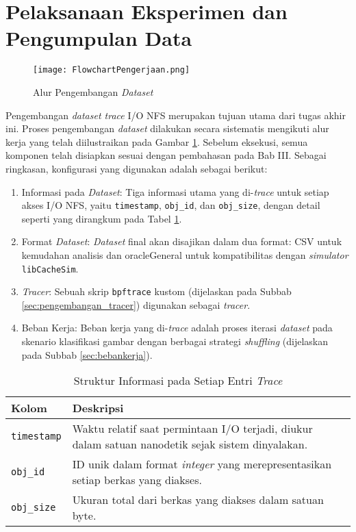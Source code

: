 \section{Pelaksanaan Eksperimen dan Pengumpulan Data}

\begin{figure}[t]
    \centering
    \texttt{[image: FlowchartPengerjaan.png]}
    \caption{Alur Pengembangan \textit{Dataset}}
    \label{fig:FlowchartPengerjaan}
\end{figure}

Pengembangan \textit{dataset trace} I/O NFS merupakan tujuan utama dari tugas akhir ini. Proses pengembangan \textit{dataset} dilakukan secara sistematis mengikuti alur kerja yang telah diilustraikan pada Gambar \ref{fig:FlowchartPengerjaan}. Sebelum eksekusi, semua komponen telah disiapkan sesuai dengan pembahasan pada Bab III. Sebagai ringkasan, konfigurasi yang digunakan adalah sebagai berikut:
\begin{enumerate}[itemsep=0pt, parsep=0pt]
    \item Informasi pada \textit{Dataset}: Tiga informasi utama yang di-\textit{trace} untuk setiap akses I/O NFS, yaitu \texttt{timestamp}, \texttt{obj\_id}, dan \texttt{obj\_size}, dengan detail seperti yang dirangkum pada Tabel \ref{tab:trace_format}.
    \item Format \textit{Dataset}: \textit{Dataset} final akan disajikan dalam dua format: CSV untuk kemudahan analisis dan oracleGeneral untuk kompatibilitas dengan \textit{simulator} \texttt{libCacheSim}.
    \item \textit{Tracer}: Sebuah skrip \texttt{bpftrace} kustom (dijelaskan pada Subbab \ref{sec:pengembangan_tracer}) digunakan sebagai \textit{tracer}.
    \item Beban Kerja: Beban kerja yang di-\textit{trace} adalah proses iterasi \textit{dataset} pada skenario klasifikasi gambar dengan berbagai strategi \textit{shuffling} (dijelaskan pada Subbab \ref{sec:bebankerja}).
\end{enumerate}

\begin{table}[t]
    \centering
    \caption{Struktur Informasi pada Setiap Entri \textit{Trace}}
    \label{tab:trace_format}
    \begin{tabular}{|l|p{}|}
        \hline
        \textbf{Kolom} & \textbf{Deskripsi} \\
        \hline
        \texttt{timestamp} & Waktu relatif saat permintaan I/O terjadi, diukur dalam satuan nanodetik sejak sistem dinyalakan. \\
        \hline
        \texttt{obj\_id}    & ID unik dalam format \textit{integer} yang merepresentasikan setiap berkas yang diakses. \\
        \hline
        \texttt{obj\_size}  & Ukuran total dari berkas yang diakses dalam satuan byte. \\
        \hline
    \end{tabular}
\end{table}

